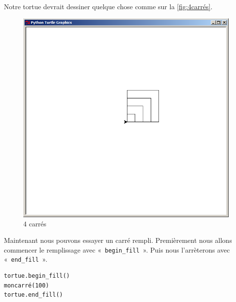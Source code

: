 Notre tortue devrait dessiner quelque chose comme sur la \autoref{fig:4carrés}.

\begin{figure}[h!]
\centering
\includegraphics[scale=0.4]{images/4carres}
\caption{4 carrés}\label{fig:4carrés}
\end{figure}

Maintenant nous pouvons essayer un carré rempli. Premièrement nous allons commencer le remplissage avec
 «~\texttt{begin\_fill}~». Puis nous l'arrèterons avec  «~\texttt{end\_fill}~».

\begin{Verbatim}[frame=single,rulecolor=\color{mbleu}, label=à taper]
tortue.begin_fill()
moncarré(100)
tortue.end_fill()
\end{Verbatim}

